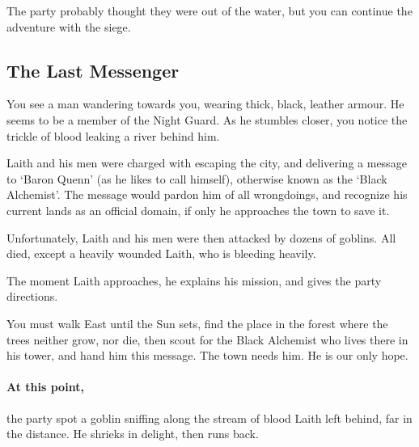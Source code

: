 \begin{multicols}{2}

\noindent
The party probably thought they were out of the water, but you can continue the adventure with the siege.

\subsection{The Last Messenger}

\begin{boxtext}

	You see a man wandering towards you, wearing thick, black, leather armour.
	He seems to be a member of the Night Guard.
	As he stumbles closer, you notice the trickle of blood leaking a river behind him.

\end{boxtext}

\begin{exampletext}

	Laith and his men were charged with escaping the city, and delivering a message to `Baron Quenn' (as he likes to call himself), otherwise known as the `Black Alchemist'.
	The message would pardon him of all wrongdoings, and recognize his current lands as an official domain, if only he approaches the town to save it.

	Unfortunately, Laith and his men were then attacked by dozens of goblins.
	All died, except a heavily wounded Laith, who is bleeding heavily.

\end{exampletext}

The moment Laith approaches, he explains his mission, and gives the party directions.

\begin{speechtext}

	You must walk East until the Sun sets, find the place in the forest where the trees neither grow, nor die, then scout for the Black Alchemist who lives there in his tower, and hand him this message.
	The town needs him.
	He is our only hope.

\end{speechtext}

\paragraph{At this point,}
the party spot a goblin sniffing along the stream of blood Laith left behind, far in the distance.
He shrieks in delight, then runs back.


\end{multicols}

